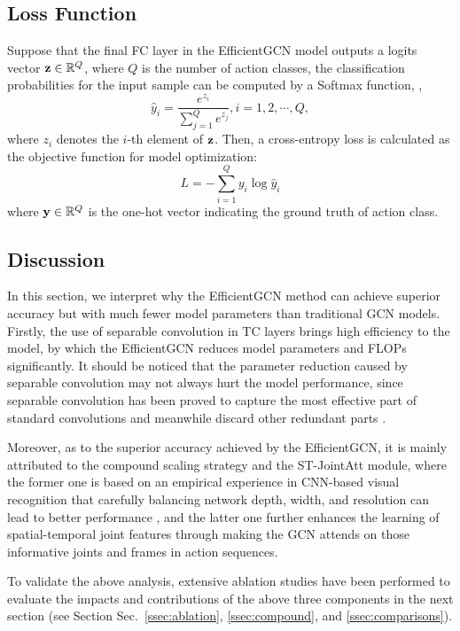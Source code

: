 \documentclass[10pt,journal,compsoc]{IEEEtran}
\begin{document}
\subsection{Loss Function}
\label{ssec:loss}

Suppose that the final FC layer in the EfficientGCN model outputs a logits vector ${\bf z}\in\mathbb{R}^{Q}$, where $Q$ is the number of action classes, the classification probabilities for the input sample can be computed by a Softmax function, \ie,
\begin{equation}
  \hat{y}_i=\frac{e^{z_i}}{\sum_{j=1}^{Q}e^{z_j}},i=1,2,\cdots,Q,
\end{equation}
where $z_i$ denotes the $i$-th element of ${\bf z}$. Then, a cross-entropy loss is calculated as the objective function for model optimization:
\begin{equation}
L=-\sum_{i=1}^{Q}y_i\log\hat{y}_i
\end{equation}
where ${\bf y}\in\mathbb{R}^{Q}$ is the one-hot vector indicating the ground truth of action class.

\subsection{Discussion}
\label{ssec:discussion}

In this section, we interpret why the EfficientGCN method can achieve superior accuracy but with much fewer model parameters than traditional GCN models. Firstly, the use of separable convolution in TC layers brings high efficiency to the model, by which the EfficientGCN reduces model parameters and FLOPs significantly. It should be noticed that the parameter reduction caused by separable convolution may not always hurt the model performance, since separable convolution has been proved to capture the most effective part of standard convolutions and meanwhile discard other redundant parts \cite{guo2018network}.

Moreover, as to the superior accuracy achieved by the EfficientGCN, it is mainly attributed to the compound scaling strategy and the ST-JointAtt module, where the former one is based on an empirical experience in CNN-based visual recognition that carefully balancing network depth, width, and resolution can lead to better performance \cite{tan2019efficientnet}, and the latter one further enhances the learning of spatial-temporal joint features through making the GCN attends on those informative joints and frames in action sequences.

To validate the above analysis, extensive ablation studies have been performed to evaluate the impacts and contributions of the above three components in the next section (see Section Sec.~\ref{ssec:ablation}, \ref{ssec:compound}, and \ref{ssec:comparisons}).
\end{document}
